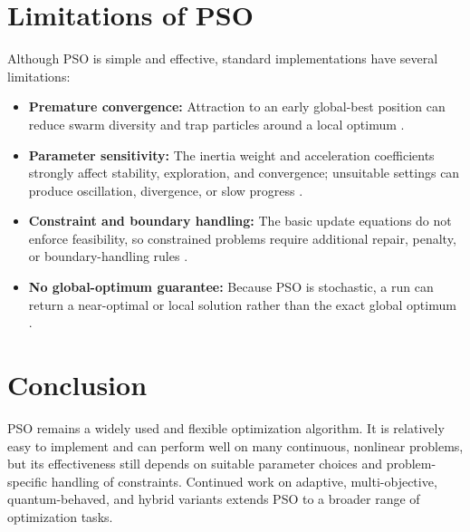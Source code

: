 \documentclass[12pt,a4paper]{article}
\begin{document}
\section{Limitations of PSO}
Although PSO is simple and effective, standard implementations have several limitations:
\begin{itemize}
    \item \textbf{Premature convergence:} Attraction to an early global-best position can reduce swarm diversity and trap particles around a local optimum \cite{poli2007}.
    \item \textbf{Parameter sensitivity:} The inertia weight and acceleration coefficients strongly affect stability, exploration, and convergence; unsuitable settings can produce oscillation, divergence, or slow progress \cite{clerc2002}.
    \item \textbf{Constraint and boundary handling:} The basic update equations do not enforce feasibility, so constrained problems require additional repair, penalty, or boundary-handling rules \cite{poli2007}.
    \item \textbf{No global-optimum guarantee:} Because PSO is stochastic, a run can return a near-optimal or local solution rather than the exact global optimum \cite{poli2007}.
\end{itemize}

\section{Conclusion}
PSO remains a widely used and flexible optimization algorithm. It is relatively easy to implement and can perform well on many continuous, nonlinear problems, but its effectiveness still depends on suitable parameter choices and problem-specific handling of constraints. Continued work on adaptive, multi-objective, quantum-behaved, and hybrid variants extends PSO to a broader range of optimization tasks.
\end{document}
